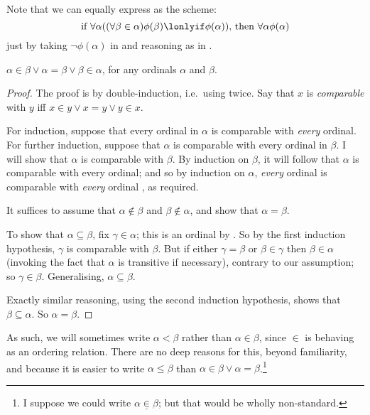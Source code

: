 \documentclass[../../../include/open-logic-section]{subfiles}
\begin{document}
Note that we can equally express  as the scheme:
	$$\text{if }\forall \alpha((\forall \beta \in \alpha)\phi(\beta) \lonlyif \phi(\alpha))\text{, then }\forall \alpha\phi(\alpha)$$
just by taking $\lnot\phi(\alpha)$ in  and reasoning as in .
\begin{thm}[Trichotomy] $\alpha \in \beta \lor \alpha = \beta \lor \beta \in \alpha$, for any ordinals $\alpha$ and $\beta$. 
\end{thm}
\begin{proof}
	The proof is by double-induction, i.e.\ using  twice. Say that $x$ is \emph{comparable} with $y$ iff $x \in y \lor x = y \lor y \in x$. 
	
	For induction, suppose that every ordinal in $\alpha$ is comparable with \emph{every} ordinal. For further induction, suppose that $\alpha$ is comparable with every ordinal in $\beta$. I will show that $\alpha$ is comparable with $\beta$. By induction on $\beta$, it will follow that $\alpha$ is comparable with every ordinal; and so by induction on $\alpha$, \emph{every} ordinal is comparable with \emph{every} ordinal , as required. 
	
	It suffices to assume that $\alpha \notin \beta$ and $\beta \notin \alpha$, and show that $\alpha = \beta$. 
	
	To show that $\alpha \subseteq \beta$, fix $\gamma \in \alpha$; this is an ordinal by . So by the first induction hypothesis, $\gamma$ is comparable with $\beta$. But if either $\gamma = \beta$ or $\beta \in \gamma$ then $\beta \in \alpha$ (invoking the fact that $\alpha$ is transitive if necessary), contrary to our assumption; so $\gamma \in \beta$. Generalising, $\alpha \subseteq \beta$.
	
	Exactly similar reasoning, using the second induction hypothesis, shows that $\beta \subseteq \alpha$. So $\alpha = \beta$.
\end{proof}\noindent
As such, we will sometimes write $\alpha <\beta$ rather than $\alpha \in \beta$, since $\in$ is behaving as an ordering relation. There are no deep reasons for this, beyond familiarity, and because it is easier to write $\alpha \leq \beta$ than $\alpha \in \beta \lor \alpha = \beta$.\footnote{I suppose we could write $\alpha \mathrel{\underline{\in}} \beta$; but that would be wholly non-standard.}
\end{document}
